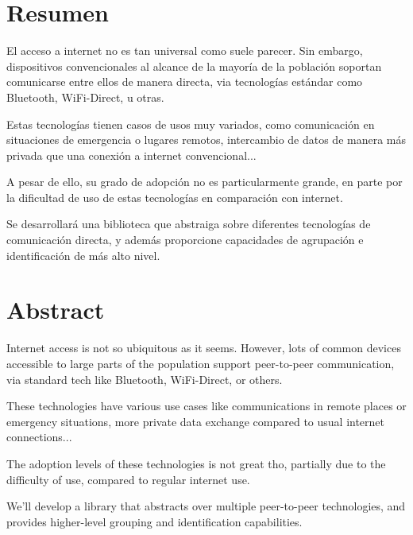 \section*{Resumen}

El acceso a internet no es tan universal como suele parecer. Sin embargo,
dispositivos convencionales al alcance de la mayoría de la población soportan
comunicarse entre ellos de manera directa, via tecnologías estándar como
Bluetooth, WiFi-Direct, u otras.

Estas tecnologías tienen casos de usos muy variados, como comunicación en
situaciones de emergencia o lugares remotos, intercambio de datos de manera más
privada que una conexión a internet convencional...

A pesar de ello, su grado de adopción no es particularmente grande, en parte
por la dificultad de uso de estas tecnologías en comparación con internet.

Se desarrollará una biblioteca que abstraiga sobre diferentes tecnologías de
comunicación directa, y además proporcione capacidades de agrupación e
identificación de más alto nivel.

\clearpage

\section*{Abstract}

Internet access is not so ubiquitous as it seems. However, lots of common
devices accessible to large parts of the population support peer-to-peer
communication, via standard tech like Bluetooth, WiFi-Direct, or others.

These technologies have various use cases like communications in remote places
or emergency situations, more private data exchange compared to usual internet
connections...

The adoption levels of these technologies is not great tho, partially due to
the difficulty of use, compared to regular internet use.

We'll develop a library that abstracts over multiple peer-to-peer technologies,
and provides higher-level grouping and identification capabilities.
